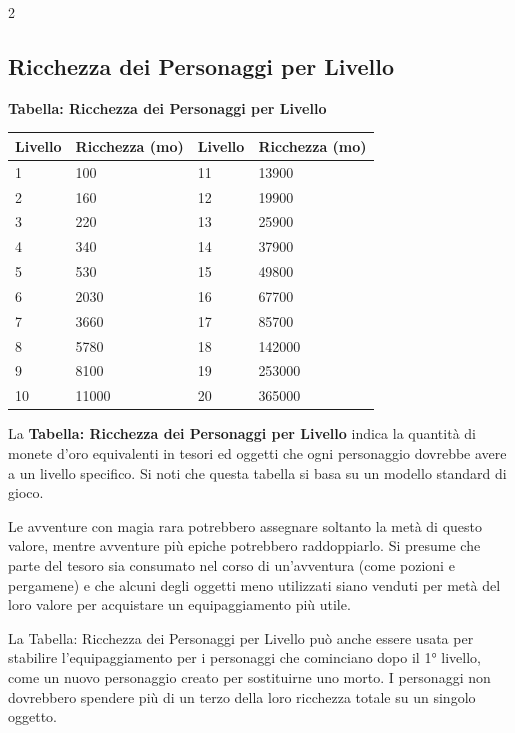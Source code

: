\begin{multicols}{2}
\subsection{Ricchezza dei Personaggi per Livello}

\textbf{Tabella: Ricchezza dei Personaggi per Livello}

\medskip

\noindent\begin{tabularx}{\linewidth}{lX|lX}
	\toprule
\rowcolor{gray!20}\textbf{Livello} & \textbf{Ricchezza (mo)} & \textbf{Livello} & \textbf{Ricchezza (mo)}\\
\toprule
1 & 100 & 11 & 13900\\
\rowcolor{gray!20}2 & 160 & 12 & 19900\\
3 & 220 & 13 & 25900\\
\rowcolor{gray!20}4 & 340 & 14 & 37900\\
5 & 530 & 15 & 49800\\
\rowcolor{gray!20}6 & 2030 & 16 & 67700\\
7 & 3660 & 17 & 85700\\
\rowcolor{gray!20}8 & 5780 & 18 & 142000\\
9 & 8100 & 19 & 253000\\
\rowcolor{gray!20}10 & 11000 & 20 & 365000
\end{tabularx}

\medskip

La \textbf{Tabella: Ricchezza dei Personaggi per Livello} indica la quantità di monete d'oro equivalenti in tesori ed oggetti che ogni personaggio dovrebbe avere a un livello specifico. Si noti che questa tabella si basa su un modello standard di gioco.

Le avventure con magia rara potrebbero assegnare soltanto la metà di questo valore, mentre avventure più epiche potrebbero raddoppiarlo. Si presume che parte del tesoro sia consumato nel corso di un'avventura (come pozioni e pergamene) e che alcuni degli oggetti meno utilizzati siano venduti per metà del loro valore per acquistare un equipaggiamento più utile.

La Tabella: Ricchezza dei Personaggi per Livello può anche essere usata per stabilire l'equipaggiamento per i personaggi che cominciano dopo il 1° livello, come un nuovo personaggio creato per sostituirne uno morto. I personaggi non dovrebbero spendere più di un terzo della loro ricchezza totale su un singolo oggetto.


\end{multicols}
